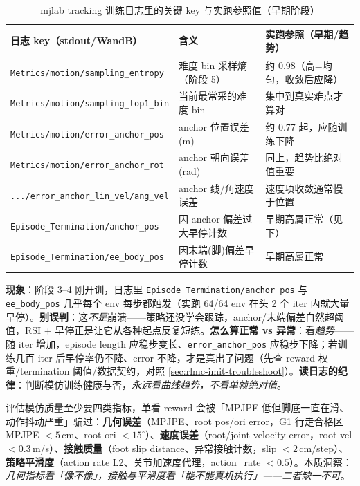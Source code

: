 \begin{table}[ht]
\centering
\small
\caption{mjlab tracking 训练日志里的关键 key 与实跑参照值（早期阶段）}
\label{tab:rlmc-imit-logkeys}
\begin{tabular}{@{}lll@{}}
\toprule
日志 key（stdout/WandB） & 含义 & 实跑参照（早期/趋势） \\
\midrule
\verb|Metrics/motion/sampling_entropy| & 难度 bin 采样熵（阶段 5） & 约 0.98（高=均匀，收敛后应降） \\
\verb|Metrics/motion/sampling_top1_bin| & 当前最常采的难度 bin & 集中到真实难点才算对 \\
\verb|Metrics/motion/error_anchor_pos| & anchor 位置误差(m) & 约 0.77 起，应随训练下降 \\
\verb|Metrics/motion/error_anchor_rot| & anchor 朝向误差(rad) & 同上，趋势比绝对值重要 \\
\verb|.../error_anchor_lin_vel/ang_vel| & anchor 线/角速度误差 & 速度项收敛通常慢于位置 \\
\verb|Episode_Termination/anchor_pos| & 因 anchor 偏差过大早停计数 & 早期高属正常（见下） \\
\verb|Episode_Termination/ee_body_pos| & 因末端(脚)偏差早停计数 & 早期高属正常 \\
\bottomrule
\end{tabular}
\end{table}

\begin{pitfall}
\textbf{现象}：阶段 3--4 刚开训，日志里 \verb|Episode_Termination/anchor_pos| 与 \verb|ee_body_pos| 几乎每个 env 每步都触发（实跑 64/64 env 在头 2 个 iter 内就大量早停）。\textbf{别误判}：这\emph{不是}崩溃——策略还没学会跟踪，anchor/末端偏差自然超阈值，RSI + 早停正是让它从各种起点反复短练。\textbf{怎么算正常 vs 异常}：看\emph{趋势}——随 iter 增加，episode length 应稳步变长、\verb|error_anchor_pos| 应稳步下降；若训练几百 iter 后早停率仍不降、error 不降，才是真出了问题（先查 reward 权重/termination 阈值/数据契约，对照 \cref{sec:rlmc-imit-troubleshoot}）。\textbf{读日志的纪律}：判断模仿训练健康与否，\emph{永远看曲线趋势，不看单帧绝对值}。
\end{pitfall}

\begin{insight}\label{ins:rlmc-imit-metrics}
评估模仿质量至少要四类指标，单看 reward 会被「MPJPE 低但脚底一直在滑、动作抖动严重」骗过：\textbf{几何误差}（MPJPE、root pos/ori error，G1 行走合格区 MPJPE $<5$\,cm、root ori $<15^\circ$）、\textbf{速度误差}（root/joint velocity error，root vel $<0.3$\,m/s）、\textbf{接触质量}（foot slip distance、异常接触计数，slip $<2$\,cm/step）、\textbf{策略平滑度}（action rate L2、关节加速度代理，action\_rate $<0.5$）。本质洞察：\emph{几何指标看「像不像」，接触与平滑度看「能不能真机执行」——二者缺一不可}。
\end{insight}


